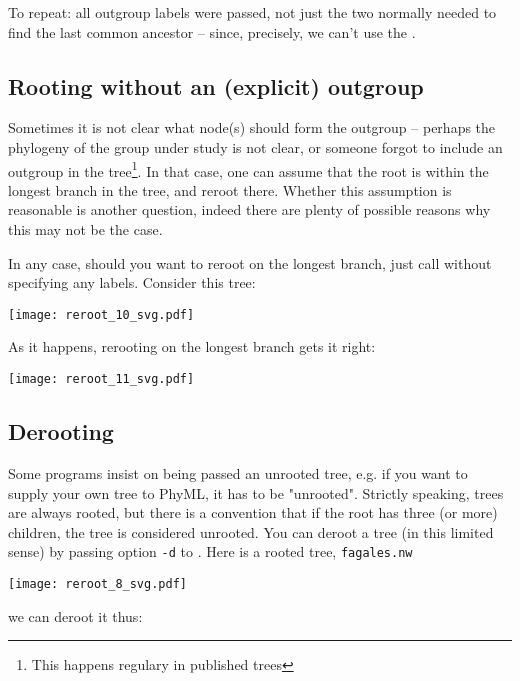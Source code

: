 \noindent{}To repeat: all outgroup labels were passed, not just the two
normally needed to find the last common ancestor -- since, precisely, we can't
use the \lca.

\subsection{Rooting without an (explicit) outgroup}
\label{sct:no-outgroup}

\noindent{}Sometimes it is not clear what node(s) should form the outgroup --
perhaps the phylogeny of the group under study is not clear, or someone forgot
to include an outgroup in the tree\footnote{This happens regulary in published
trees}. In that case, one can assume that the root is within the longest branch
in the tree, and reroot there. Whether this assumption is reasonable is another
question, indeed there are plenty of possible reasons why this may not be the
case.

In any case, should you want to reroot on the longest branch, just call
\reroot{} without specifying any labels. Consider this tree:
\begin{center}
\texttt{[image: reroot\_10\_svg.pdf]}
\end{center}

As it happens, rerooting on the longest branch gets it right:


\begin{center}
\texttt{[image: reroot\_11\_svg.pdf]}
\end{center}






\subsection{Derooting}

Some programs insist on being passed an unrooted tree, e.g. if you want to
supply your own tree to PhyML, it has to be "unrooted". Strictly speaking,
\nw{} trees are always rooted, but there is a convention that if the root has
three (or more) children, the tree is considered unrooted. You can deroot a
tree (in this limited sense) by passing option \texttt{-d} to \reroot{}. Here
is a rooted tree, \texttt{fagales.nw}

\begin{center}
\texttt{[image: reroot\_8\_svg.pdf]}
\end{center}

\noindent{}we can deroot it thus:


